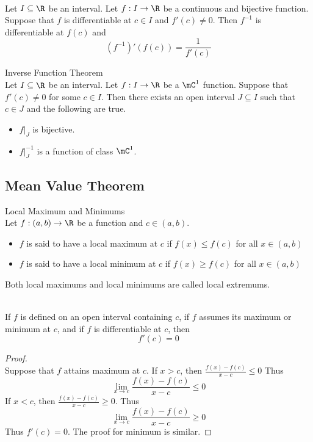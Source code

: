 \documentclass[a4paper]{article}
\begin{document}
\begin{prp}{}{}\\
Let $I\subseteq\R$ be an interval. Let $f:I\to\R$ be a continuous and bijective function. Suppose that $f$ is differentiable at $c\in I$ and $f'(c)\neq 0$. Then $f^{-1}$ is differentiable at $f(c)$ and $$(f^{-1})'(f(c))=\frac{1}{f'(c)}$$
\end{prp}

\begin{thm}{Inverse Function Theorem}{}\\
Let $I\subseteq\R$ be an interval. Let $f:I\to\R$ be a $\mC^1$ function. Suppose that $f'(c)\neq 0$ for some $c\in I$. Then there exists an open interval $J\subseteq I$ such that $c\in J$ and the following are true. 
\begin{itemize}
\item $f|_J$ is bijective. 
\item $f|_J^{-1}$ is a function of class $\mC^1$. 
\end{itemize}
\end{thm}

\subsection{Mean Value Theorem}
\begin{defn}{Local Maximum and Minimums}{}\\ Let $f:(a,b)\to\R$ be a function and $c\in(a,b)$. 
\begin{itemize}
\item $f$ is said to have a local maximum at $c$ if $f(x)\leq f(c)$ for all $x\in(a,b)$
\item $f$ is said to have a local minimum at $c$ if $f(x)\geq f(c)$ for all $x\in(a,b)$
\end{itemize}
Both local maximums and local minimums are called local extremums. 
\end{defn}

\begin{thm}{}{}\\ If $f$ is defined on an open interval containing $c$, if $f$ assumes its maximum or minimum at $c$, and if $f$ is differentiable at $c$, then $$f'(c)=0$$ 
\begin{proof}\\ Suppose that $f$ attains maximum at $c$. If $x>c$, then $\frac{f(x)-f(c)}{x-c}\leq 0$ Thus $$\lim_{x\to c}\frac{f(x)-f(c)}{x-c}\leq 0$$ If $x<c$, then $\frac{f(x)-f(c)}{x-c}\geq 0$. Thus $$\lim_{x\to c}\frac{f(x)-f(c)}{x-c}\geq 0$$ Thus $f'(c)=0$. The proof for minimum is similar. 
\end{proof}
\end{thm}
\end{document}
